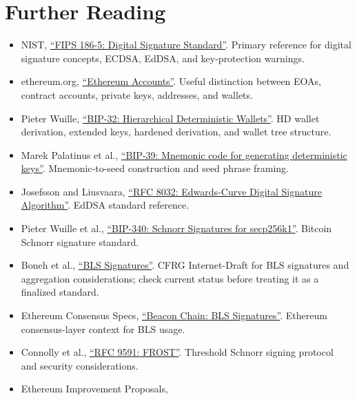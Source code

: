 \section{Further Reading}

\begin{itemize}
\tightlist
\item
  NIST,
  \href{https://nvlpubs.nist.gov/nistpubs/FIPS/NIST.FIPS.186-5.pdf}{``FIPS
  186-5: Digital Signature Standard''}. Primary reference for digital
  signature concepts, ECDSA, EdDSA, and key-protection warnings.
\item
  ethereum.org,
  \href{https://ethereum.org/developers/docs/accounts/}{``Ethereum
  Accounts''}. Useful distinction between EOAs, contract accounts,
  private keys, addresses, and wallets.
\item
  Pieter Wuille,
  \href{https://github.com/bitcoin/bips/blob/master/bip-0032.mediawiki}{``BIP-32:
  Hierarchical Deterministic Wallets''}. HD wallet derivation, extended
  keys, hardened derivation, and wallet tree structure.
\item
  Marek Palatinus et al.,
  \href{https://github.com/bitcoin/bips/blob/master/bip-0039.mediawiki}{``BIP-39:
  Mnemonic code for generating deterministic keys''}. Mnemonic-to-seed
  construction and seed phrase framing.
\item
  Josefsson and Liusvaara,
  \href{https://datatracker.ietf.org/doc/html/rfc8032}{``RFC 8032:
  Edwards-Curve Digital Signature Algorithm''}. EdDSA standard
  reference.
\item
  Pieter Wuille et al.,
  \href{https://github.com/bitcoin/bips/blob/master/bip-0340.mediawiki}{``BIP-340:
  Schnorr Signatures for secp256k1''}. Bitcoin Schnorr signature
  standard.
\item
  Boneh et al.,
  \href{https://datatracker.ietf.org/doc/html/draft-irtf-cfrg-bls-signature}{``BLS
  Signatures''}. CFRG Internet-Draft for BLS signatures and aggregation
  considerations; check current status before treating it as a finalized
  standard.
\item
  Ethereum Consensus Specs,
  \href{https://ethereum.github.io/consensus-specs/specs/phase0/beacon-chain/\#bls-signatures}{``Beacon
  Chain: BLS Signatures''}. Ethereum consensus-layer context for BLS
  usage.
\item
  Connolly et al.,
  \href{https://www.rfc-editor.org/rfc/rfc9591.html}{``RFC 9591:
  FROST''}. Threshold Schnorr signing protocol and security
  considerations.
\item
  Ethereum Improvement Proposals,

\end{itemize}
